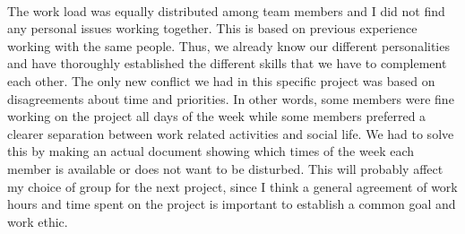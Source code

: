 \\
The work load was equally distributed among team members and I did not find any personal issues working together. This is based on previous experience working with the same people. Thus, we already know our different personalities and have thoroughly established the different skills that we have to complement each other. The only new conflict we had in this specific project was based on disagreements about time and priorities. In other words, some members were fine working on the project all days of the week while some members preferred a clearer separation between work related activities and social life. We had to solve this by making an actual document showing which times of the week each member is available or does not want to be disturbed. This will probably affect my choice of group for the next project, since I think a general agreement of work hours and time spent on the project is important to establish a common goal and work ethic. 
